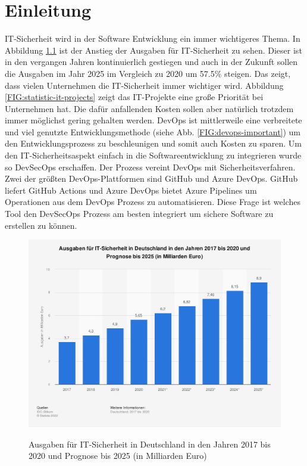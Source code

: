 \chapter{Einleitung}
IT-Sicherheit wird in der Software Entwicklung ein immer wichtigeres  Thema. In Abbildung \ref{FIG:statistic-ausgaben-it-sicherheit} ist der Anstieg der Ausgaben für IT-Sicherheit zu sehen. Dieser ist in den vergangen Jahren kontinuierlich gestiegen und auch in der Zukunft sollen die Ausgaben im Jahr 2025 im Vergleich zu 2020 um 57.5\% steigen. Das zeigt, dass vielen Unternehmen die IT-Sicherheit immer wichtiger wird. Abbildung \ref{FIG:statistic-it-projects} zeigt das IT-Projekte eine große Priorität bei Unternehmen hat. Die dafür anfallenden Kosten sollen aber natürlich trotzdem immer möglichst gering gehalten werden.
DevOps ist mittlerweile eine verbreitete und viel genutzte Entwicklungsmethode (siehe Abb. \ref{FIG:devops-important}) um den Entwicklungsprozess zu beschleunigen und somit auch Kosten zu sparen. Um den IT-Sicherheitsaspekt einfach in die Softwareentwicklung zu integrieren wurde so DevSecOps erschaffen. Der Prozess vereint DevOps mit Sicherheitsverfahren. \cite{security-model}
Zwei der größten DevOps-Plattformen sind GitHub und Azure DevOps. GitHub liefert GitHub Actions und Azure DevOps bietet Azure Pipelines um Operationen aus dem DevOps Prozess zu automatisieren. Diese Frage ist welches Tool den DevSecOps Prozess am besten integriert um sichere Software zu erstellen zu können.


\begin{figure}[H]
	{\caption{Ausgaben für IT-Sicherheit in Deutschland in den Jahren 2017 bis 2020 und Prognose bis 2025 (in Milliarden Euro)}
		\label{FIG:statistic-ausgaben-it-sicherheit}}
	{\includegraphics[width=1\textwidth]{figures/statistic-ausgaben-it-sicherheit.png}}
\end{figure}

